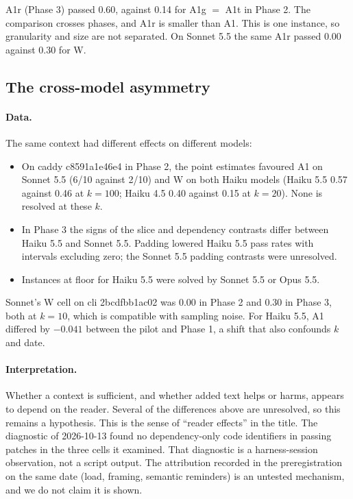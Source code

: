 A1r (Phase 3) passed 0.60, against 0.14 for A1g $=$ A1t in Phase 2. The comparison crosses phases, and A1r is smaller than A1. This is one instance, so granularity and size are not separated. On Sonnet 5.5 the same A1r passed 0.00 against 0.30 for W.

\subsection{The cross-model asymmetry}

\paragraph{Data.} The same context had different effects on different models:
\begin{itemize}
\item On caddy c8591a1e46e4 in Phase 2, the point estimates favoured A1 on Sonnet 5.5 (6/10 against 2/10) and W on both Haiku models (Haiku 5.5 0.57 against 0.46 at $k=100$; Haiku 4.5 0.40 against 0.15 at $k=20$). None is resolved at these $k$.
\item In Phase 3 the signs of the slice and dependency contrasts differ between Haiku 5.5 and Sonnet 5.5. Padding lowered Haiku 5.5 pass rates with intervals excluding zero; the Sonnet 5.5 padding contrasts were unresolved.
\item Instances at floor for Haiku 5.5 were solved by Sonnet 5.5 or Opus 5.5.
\end{itemize}

Sonnet's W cell on cli 2bcdfbb1ac02 was 0.00 in Phase 2 and 0.30 in Phase 3, both at $k=10$, which is compatible with sampling noise. For Haiku 5.5, A1 differed by $-0.041$ between the pilot and Phase 1, a shift that also confounds $k$ and date.

\paragraph{Interpretation.} Whether a context is sufficient, and whether added text helps or harms, appears to depend on the reader. Several of the differences above are unresolved, so this remains a hypothesis. This is the sense of ``reader effects'' in the title. The diagnostic of 2026-10-13 found no dependency-only code identifiers in passing patches in the three cells it examined. That diagnostic is a harness-session observation, not a script output. The attribution recorded in the preregistration on the same date (load, framing, semantic reminders) is an untested mechanism, and we do not claim it is shown.

